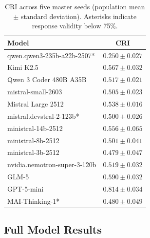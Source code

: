 \documentclass{article}
\begin{document}
\begin{table}[H]
\centering
\caption{CRI across five master seeds (population mean $\pm$ standard deviation). Asterisks indicate response validity below 75\%.}
\label{tab:cri_seed_variance}
\scriptsize
\begin{tabular}{lc}
\toprule
\textbf{Model} & \textbf{CRI} \\
\midrule
qwen.qwen3-235b-a22b-2507* & $0.250 \pm 0.027$ \\
Kimi K2.5 & $0.567 \pm 0.032$ \\
Qwen 3 Coder 480B A35B & $0.517 \pm 0.021$ \\
mistral-small-2603 & $0.505 \pm 0.023$ \\
Mistral Large 2512 & $0.538 \pm 0.016$ \\
mistral.devstral-2-123b* & $0.500 \pm 0.026$ \\
ministral-14b-2512 & $0.556 \pm 0.065$ \\
ministral-8b-2512 & $0.501 \pm 0.041$ \\
ministral-3b-2512 & $0.479 \pm 0.047$ \\
nvidia.nemotron-super-3-120b & $0.519 \pm 0.032$ \\
GLM-5 & $0.590 \pm 0.032$ \\
GPT-5-mini & $0.814 \pm 0.034$ \\
MAI-Thinking-1* & $0.480 \pm 0.049$ \\
\bottomrule
\end{tabular}
\end{table}

\subsection{Full Model Results}
\label{app:full_model}
\end{document}
